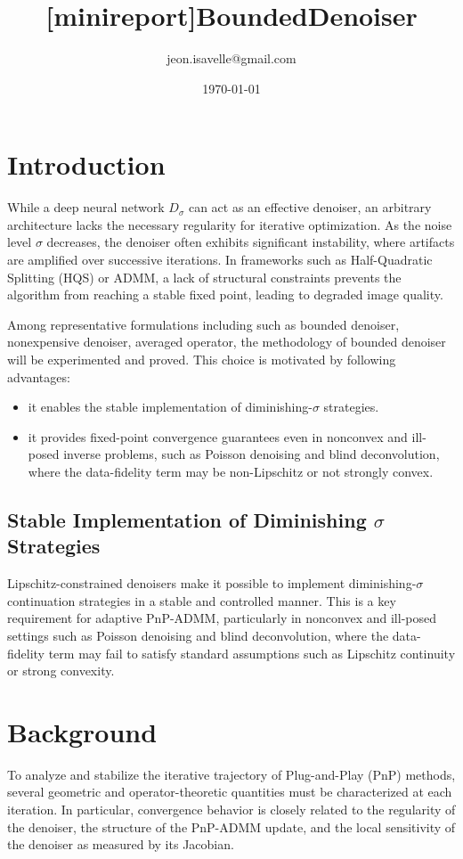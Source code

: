 \documentclass{article}
\title{[minireport]BoundedDenoiser}
\author{jeon.isavelle@gmail.com}
\date{\today}
\begin{document}
\maketitle

\section{Introduction}
While a deep neural network $D_{\sigma}$ can act as an effective denoiser, an arbitrary architecture lacks the necessary regularity for iterative optimization.
As the noise level $\sigma$ decreases, the denoiser often exhibits significant instability, where artifacts are amplified over successive iterations.
In frameworks such as Half-Quadratic Splitting (HQS) or ADMM, a lack of structural constraints prevents the algorithm from reaching a stable fixed point, leading to degraded image quality.

Among representative formulations including such as bounded denoiser, nonexpensive denoiser, averaged operator, the methodology of bounded denoiser will be experimented and proved.
This choice is motivated by following advantages:

\begin{itemize}
    \item it enables the stable implementation of diminishing-$\sigma$ strategies.
    \item it provides fixed-point convergence guarantees even in nonconvex and ill-posed inverse problems, such as Poisson denoising and blind deconvolution, where the data-fidelity term may be non-Lipschitz or not strongly convex.
\end{itemize}

\subsection{Stable Implementation of Diminishing $\sigma$ Strategies}
Lipschitz-constrained denoisers make it possible to implement diminishing-$\sigma$ continuation strategies in a stable and controlled manner.
This is a key requirement for adaptive PnP-ADMM, particularly in nonconvex and ill-posed settings such as Poisson denoising and blind deconvolution, where the data-fidelity term may fail to satisfy standard assumptions such as Lipschitz continuity or strong convexity.




\section{Background}
To analyze and stabilize the iterative trajectory of Plug-and-Play (PnP) methods, several geometric and operator-theoretic quantities must be characterized at each iteration.
In particular, convergence behavior is closely related to the regularity of the denoiser, the structure of the PnP-ADMM update, and the local sensitivity of the denoiser as measured by its Jacobian.
\end{document}
